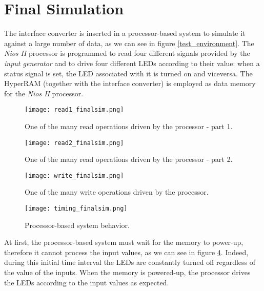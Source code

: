 \documentclass[10pt, english, a4paper, titlepage, oneside]{book}
\begin{document}
\section{Final Simulation}
\vspace{2mm}
The interface converter is inserted in a processor-based system to simulate it against a large number of data, as we can see in figure \ref{test_environment}. The \textit{Nios II} processor is programmed to read four different signals provided by the \textit{input generator} and to drive four different LEDs according to their value: when a status signal is set, the LED associated with it is turned on and viceversa. The HyperRAM (together with the interface converter) is employed as data memory for the \textit{Nios II} processor.
\vspace{4mm}
\begin{figure}[H]
    \centering
    \captionsetup{width=18cm}
    \texttt{[image: read1\_finalsim.png]}
    \caption{\centering One of the many read operations driven by the processor - part 1.}
    \label{read1_finalsim}
\end{figure}
\begin{figure}[H]
    \centering
    \captionsetup{width=18cm}
    \texttt{[image: read2\_finalsim.png]}
    \caption{\centering One of the many read operations driven by the processor - part 2.}
    \label{read2_finalsim}
\end{figure}
\begin{figure}[H]
    \centering
    \captionsetup{width=18cm}
    \texttt{[image: write\_finalsim.png]}
    \caption{\centering One of the many write operations driven by the processor.}
    \label{write_finalsim}
\end{figure}
\begin{figure}[H]
    \centering
    \captionsetup{width=16cm}
    \texttt{[image: timing\_finalsim.png]}
    \caption{\centering Processor-based system behavior.}
    \label{timing_finalsim}
\end{figure}
\vspace{4mm}
\noindent At first, the processor-based system must wait for the memory to power-up, therefore it cannot process the input values, as we can see in figure \ref{timing_finalsim}. Indeed, during this initial time interval the LEDs are constantly turned off regardless of the value of the inputs. When the memory is powered-up, the processor drives the LEDs according to the input values as expected.
\vspace{6mm}
\end{document}

